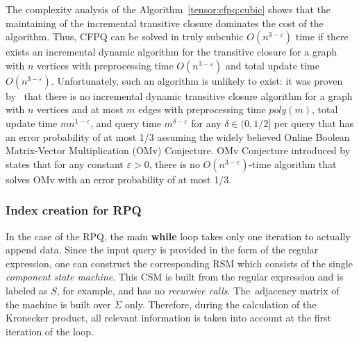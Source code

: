 The complexity analysis of the Algorithm~\ref{tensor:cfpq:cubic} shows that the maintaining of the incremental transitive closure dominates the cost of the algorithm. Thus, CFPQ can be solved in truly subcubic $O(n^{3-\varepsilon})$ time if there exists an incremental dynamic algorithm for the transitive closure for a graph with $n$ vertices with preprocessing time $O(n^{3-\varepsilon})$ and total update time $O(n^{3-\varepsilon})$. Unfortunately, such an algorithm is unlikely to exist: it was proven by~\cite{10.1145/2746539.2746609} that there is no incremental dynamic transitive closure algorithm for a graph with $n$ vertices and at most $m$ edges with preprocessing time $poly(m)$, total update time $mn^{1-\varepsilon}$, and query time $m^{\delta-\varepsilon}$ for any $\delta \in (0, 1/2]$ per query that has an error probability of at most 1/3 assuming the widely believed Online Boolean Matrix-Vector Multiplication (OMv) Conjecture. OMv Conjecture introduced by~\cite{10.1145/2746539.2746609} states that for any constant $ \varepsilon>0$, there is no $O(n^{3-\varepsilon})$-time algorithm that solves OMv with an error probability of at most 1/3.



\subsubsection{Index creation for RPQ}
In the case of the RPQ, the main \textbf{while} loop takes only one iteration to actually append data.
Since the input query is provided in the form of the regular expression, one can construct the corresponding RSM which consists of the single \textit{component state machine}.
This CSM is built from the regular expression and is labeled as $S$, for example, and has no \textit{recursive calls}.
The~adjacency matrix of the machine is built over $\Sigma$ only.
Therefore, during the calculation of the Kronecker product, all relevant information is taken into account at the first iteration of the loop.